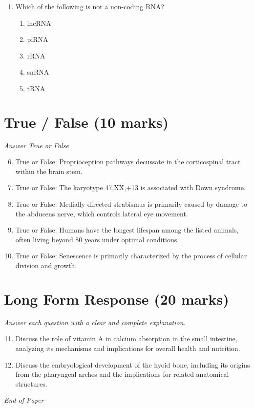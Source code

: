 \documentclass[12pt]{article}
\begin{document}
\begin{enumerate}[label=\arabic*.]
\begin{enumerate}[label=(\alph*)]
    \item 10-15\%
    \item \textgreater{}20\%
    \item \textless{}10\%
    \item \textgreater{}15\%
    \item \textless{}5\%
\end{enumerate}
\item Which of the following is not a non-coding RNA?
\begin{enumerate}[label=(\alph*)]
    \item lncRNA
    \item piRNA
    \item rRNA
    \item snRNA
    \item tRNA
\end{enumerate}
\end{enumerate}

\section*{True / False (10 marks)}
\textit{Answer True or False}
\begin{enumerate}[label=\arabic*.]
\setcounter{enumi}{5}
\item True or False: Proprioception pathways decussate in the corticospinal tract within the brain stem.
\item True or False: The karyotype 47,XX,+13 is associated with Down syndrome.
\item True or False: Medially directed strabismus is primarily caused by damage to the abducens nerve, which controls lateral eye movement.
\item True or False: Humans have the longest lifespan among the listed animals, often living beyond 80 years under optimal conditions.
\item True or False: Senescence is primarily characterized by the process of cellular division and growth.
\end{enumerate}

\section*{Long Form Response (20 marks)}
\textit{Answer each question with a clear and complete explanation.}
\begin{enumerate}[label=\arabic*.]
\setcounter{enumi}{10}
\item Discuss the role of vitamin A in calcium absorption in the small intestine, analyzing its mechanisms and implications for overall health and nutrition.
\item Discuss the embryological development of the hyoid bone, including its origins from the pharyngeal arches and the implications for related anatomical structures.
\end{enumerate}

\vfill
\noindent\textit{End of Paper}
\end{document}
